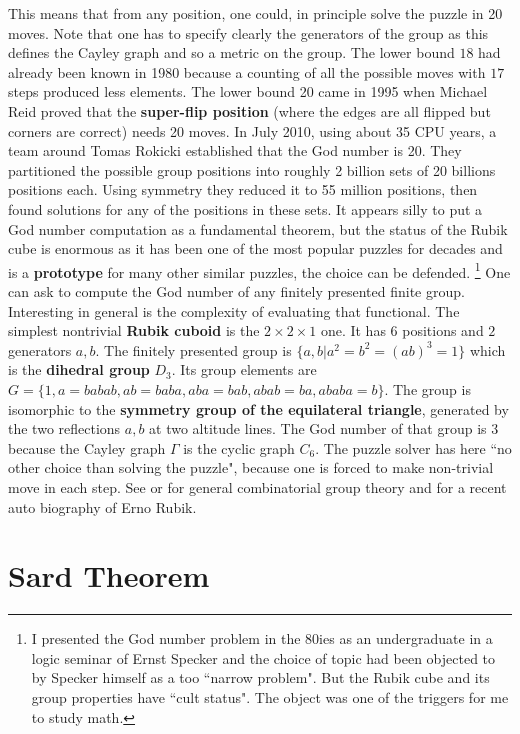 \documentclass[12pt]{amsart}
\begin{document}
This means that from any position, one could, in principle
solve the puzzle in 20 moves. Note that one has to specify clearly
the generators of the group as this defines the Cayley
graph and so a metric on the group. The lower bound $18$ had already been known in 1980
because a counting of all the possible moves with $17$ steps produced less elements.
The lower bound 20 came in 1995 when Michael Reid proved that the {\bf super-flip position}
(where the edges are all flipped but corners are correct) needs 20 moves.
In July 2010, using about 35 CPU years, a team around Tomas Rokicki established
that the God number is 20. They partitioned the possible group positions into roughly 2 billion sets of 20
billions positions each. Using symmetry they reduced it to 55 million positions,
then found solutions for any of the positions in these sets. \cite{GodNumber}
It appears silly to put a God number computation as a fundamental theorem, but the
status of the Rubik cube is enormous as it has been one of the most popular puzzles for decades and
is a {\bf prototype} for many other similar puzzles, the choice can be defended.
\footnote{I presented the God number problem in the 80ies as an undergraduate in a logic seminar
of Ernst Specker and the choice of topic had been objected to by Specker himself as a too
``narrow problem". But the Rubik cube and its group properties have 
``cult status". The object was one of the triggers for me to study math. }
One can ask to compute the God number of any finitely presented finite group.
Interesting in general is the complexity of evaluating that functional.
The simplest nontrivial {\bf Rubik cuboid} is the $2 \times 2 \times 1$ one. It has
$6$ positions and $2$ generators $a,b$. The finitely presented group is $\{ a,b | a^2=b^2=(ab)^3=1 \}$
which is the {\bf dihedral group} $D_3$. Its group elements are
$G=\{ 1,a=babab,ab=baba,aba=bab,abab=ba,ababa=b \}$. The group is isomorphic to
the {\bf symmetry group of the equilateral triangle}, generated by the two reflections $a,b$ 
at two altitude lines. The God number of that group is 3 because
the Cayley graph $\Gamma$ is the cyclic graph $C_6$. The puzzle solver has
here ``no other choice than solving the puzzle", because one is forced to make non-trivial move in each step. 
See \cite{Joyner} or \cite{Baumslag} for general combinatorial group theory
and \cite{CubedRubik} for a recent auto biography of Erno Rubik. 

\section{Sard Theorem}
\end{document}
